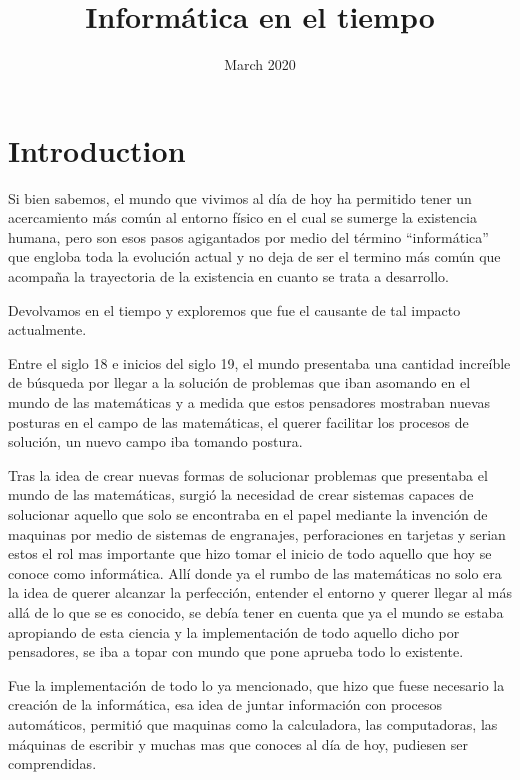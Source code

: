 \documentclass[11pt]{article}
\title{Informática en el tiempo}
\author{Juan David Londoño Castaño\\%
    \href{\textbf{}{juan.londono49@udea.edu.co}}
    }
\date{March 2020}
\begin{document}
\maketitle

\section{Introduction}

Si bien sabemos, el mundo que vivimos al día de hoy ha permitido tener un acercamiento más común al entorno físico en el cual se sumerge la existencia humana, pero son esos pasos agigantados por medio del término “informática” que engloba toda la evolución actual y no deja de ser el termino más común que acompaña la trayectoria de la existencia en cuanto se trata a desarrollo.

Devolvamos en el tiempo y exploremos que fue el causante de tal impacto actualmente.

Entre el siglo 18 e inicios del siglo 19, el mundo presentaba una cantidad increíble de búsqueda por llegar a la solución de problemas que iban asomando en el mundo de las matemáticas y a medida que estos pensadores mostraban nuevas posturas en el campo de las matemáticas, el querer facilitar los procesos de solución, un nuevo campo iba tomando postura.

Tras la idea de crear nuevas formas de solucionar problemas que presentaba el mundo de las matemáticas, surgió la necesidad de crear sistemas capaces de solucionar aquello que solo se encontraba en el papel mediante la invención de maquinas por medio de sistemas de engranajes, perforaciones en tarjetas y serian estos el rol mas importante que hizo tomar el inicio de todo aquello que hoy se conoce como informática.
Allí donde ya el rumbo de las matemáticas no solo era la idea de querer alcanzar la perfección, entender el entorno y querer llegar al más allá de lo que se es conocido, se debía tener en cuenta que ya el mundo se estaba apropiando de esta ciencia y la implementación de todo aquello dicho por pensadores, se iba a topar con mundo que pone aprueba todo lo existente.

Fue la implementación de todo lo ya mencionado, que hizo que fuese necesario la creación de la informática, esa idea de juntar información con procesos automáticos, permitió que maquinas como la calculadora, las computadoras, las máquinas de escribir y muchas mas que conoces al día de hoy, pudiesen ser comprendidas.
\end{document}

